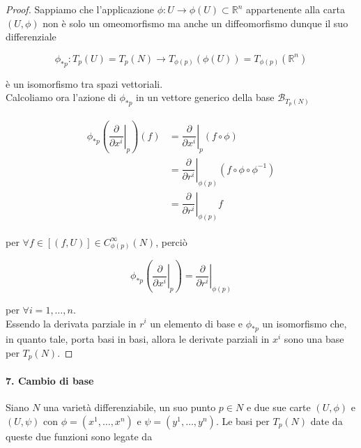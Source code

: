 \begin{proof}
	Sappiamo che l'applicazione $ \phi : U \to \phi(U) \subset \mathbb{R}^{n} $ appartenente alla carta $ (U,\phi) $ non è solo un omeomorfismo ma anche un diffeomorfismo dunque il suo differenziale
	
	\begin{equation}
		\phi_{*p} : T_{p}(U) = T_{p}(N) \to T_{\phi(p)}(\phi(U)) = T_{\phi(p)}(\mathbb{R}^{n})
	\end{equation}

	è un isomorfismo tra spazi vettoriali.\\
	Calcoliamo ora l'azione di $ \phi_{*p} $ in un vettore generico della base $ \mathcal{B}_{T_{p}(N)} $
	
	\begin{align}
		\begin{split}
			\phi_{*p} \left( \left. \dfrac{\partial}{\partial x^{i}} \right|_{p} \right) (f) &= \left. \dfrac{\partial}{\partial x^{i}} \right|_{p} (f \circ \phi)\\
			&= \left. \dfrac{\partial}{\partial r^{i}} \right|_{\phi(p)} (f \circ \phi \circ \phi^{-1})\\
			&= \left. \dfrac{\partial}{\partial r^{i}} \right|_{\phi(p)} f
		\end{split}
	\end{align}

	per $ \forall f \in [(f,U)] \in C_{\phi(p)}^{\infty}(N) $, perciò
	
	\begin{equation}
		\phi_{*p} \left( \left. \dfrac{\partial}{\partial x^{i}} \right|_{p} \right) = \left. \dfrac{\partial}{\partial r^{i}} \right|_{\phi(p)}
	\end{equation}

	per $ \forall i=1,\dots,n $.\\
	Essendo la derivata parziale in $ r^{i} $ un elemento di base e $ \phi_{*p} $ un isomorfismo che, in quanto tale, porta basi in basi, allora le derivate parziali in $ x^{i} $ sono una base per $ T_{p}(N) $.
\end{proof}

\paragraph{7. Cambio di base}

Siano $ N $ una varietà differenziabile, un suo punto $ p \in N $ e due sue carte $ (U,\phi) $ e $ (U,\psi) $ con $ \phi = (x^{1},\dots,x^{n}) $ e $ \psi = (y^{1},\dots,y^{n}) $. Le basi per $ T_{p}(N) $ date da queste due funzioni sono legate da

